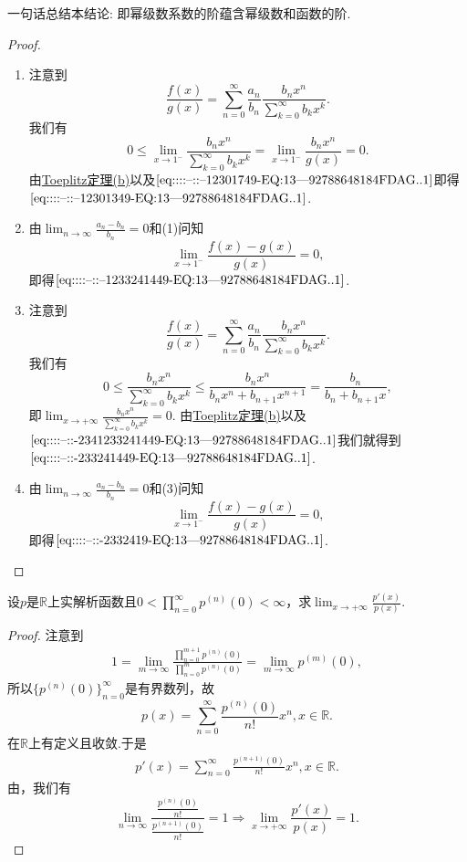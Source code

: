 \documentclass[../../main.tex]{subfiles}
\begin{document}
\begin{remark}
一句话总结本结论: 即幂级数系数的阶蕴含幂级数和函数的阶.
\end{remark}
\begin{proof}
\begin{enumerate}[(1)]
\item 注意到
\[
\frac{f(x)}{g(x)} = \sum_{n=0}^{\infty} \frac{a_n}{b_n} \frac{b_n x^n}{\sum\limits_{k=0}^{\infty} b_k x^k}.
\]
我们有
\[
0 \leqslant \lim_{x \to 1^-} \frac{b_n x^n}{\sum\limits_{k=0}^{\infty} b_k x^k} = \lim_{x \to 1^-} \frac{b_n x^n}{g(x)} = 0.
\]
由\hyperref[theorem:Toeplitz定理]{Toeplitz定理(b)}以及\(\eqref{eq::::--::--12301749-EQ:13---92788648184FDAG..1}\)即得\(\eqref{eq::::--::--12301349-EQ:13---92788648184FDAG..1}\).

\item 由\(\lim_{n \to \infty} \frac{a_n - b_n}{b_n} = 0\)和(1)问知
\[
\lim_{x \to 1^-} \frac{f(x) - g(x)}{g(x)} = 0,
\]
即得\(\eqref{eq::::--::--1233241449-EQ:13---92788648184FDAG..1}\).

\item 注意到
\[
\frac{f(x)}{g(x)} = \sum_{n=0}^{\infty} \frac{a_n}{b_n} \frac{b_n x^n}{\sum\limits_{k=0}^{\infty} b_k x^k}.
\]
我们有
\[
0 \leqslant \frac{b_n x^n}{\sum\limits_{k=0}^{\infty} b_k x^k} \leqslant \frac{b_n x^n}{b_n x^n + b_{n+1} x^{n+1}} = \frac{b_n}{b_n + b_{n+1} x},
\]
即\(\lim_{x \to +\infty} \frac{b_n x^n}{\sum\limits_{k=0}^{\infty} b_k x^k} = 0\). 由\hyperref[theorem:Toeplitz定理]{Toeplitz定理(b)}以及\(\eqref{eq::::--::-2341233241449-EQ:13---92788648184FDAG..1}\)我们就得到\(\eqref{eq::::--::-233241449-EQ:13---92788648184FDAG..1}\).

\item 由\(\lim_{n \to \infty} \frac{a_n - b_n}{b_n} = 0\)和(3)问知
\[
\lim_{x \to 1^-} \frac{f(x) - g(x)}{g(x)} = 0,
\]
即得\(\eqref{eq::::--::-2332419-EQ:13---92788648184FDAG..1}\).
\end{enumerate}
\end{proof}

\begin{example}
设\(p\)是\(\mathbb{R}\)上实解析函数且\(0 < \prod_{n=0}^{\infty} p^{(n)}(0) < \infty\)，求\(\lim_{x \to +\infty} \frac{p'(x)}{p(x)}\).
\end{example}
\begin{proof}
注意到
\begin{align*}
1=\underset{m\rightarrow \infty}{\lim}\frac{\prod\limits_{n=0}^{m+1}{p^{\left( n \right)}\left( 0 \right)}}{\prod\limits_{n=0}^m{p^{\left( n \right)}\left( 0 \right)}}=\lim_{m\rightarrow \infty} p^{\left( m \right)}\left( 0 \right),
\end{align*}
所以\(\{p^{(n)}(0)\}_{n=0}^{\infty}\)是有界数列，故
\[
p(x)=\sum_{n=0}^{\infty}{\frac{p^{(n)}(0)}{n!}x^n,}x\in \mathbb{R} .
\]
在$\mathbb{R}$上有定义且收敛.于是
\begin{align*}
p'(x)=\sum_{n=0}^{\infty}{\frac{p^{(n+1)}(0)}{n!}x^n,}x\in \mathbb{R} .
\end{align*}
由，我们有
\[
\lim_{n \to \infty} \frac{\frac{p^{(n)}(0)}{n!}}{\frac{p^{(n+1)}(0)}{n!}} = 1 \Rightarrow \lim_{x \to +\infty} \frac{p'(x)}{p(x)} = 1.
\]
\end{proof}
\end{document}
